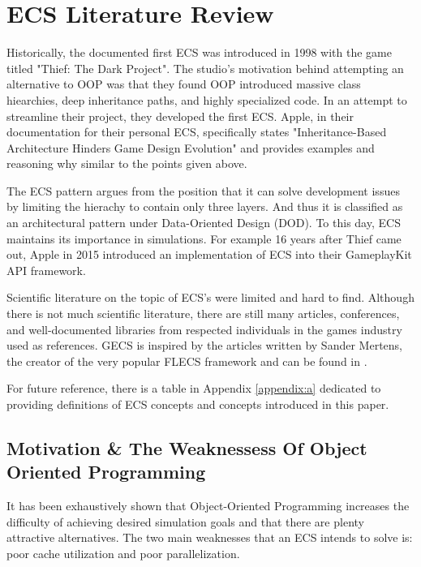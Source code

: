 \section{ECS Literature Review}
\label{chap:1}

Historically, the documented first ECS was introduced in 1998 with the game titled "Thief: The Dark Project".\cite{RomeoPHD} The studio's motivation behind attempting an alternative to OOP was that they found OOP introduced massive class hiearchies, deep inheritance paths, and highly specialized code. In an attempt to streamline their project, they developed the first ECS.\cite{Haerkoenen2019} Apple, in their documentation for their personal ECS, specifically states "Inheritance-Based Architecture Hinders Game Design Evolution" and provides examples and reasoning why similar to the points given above.\cite{AppleECSBad}

The ECS pattern argues from the position that it can solve development issues by limiting the hierachy to contain only three layers. And thus it is classified as an architectural pattern under Data-Oriented Design (DOD).\cite{RomeoPHD} To this day, ECS maintains its importance in simulations. For example 16 years after Thief came out, Apple in 2015 introduced an implementation of ECS into their GameplayKit API framework. \cite{AppleECS}

Scientific literature on the topic of ECS's were limited and hard to find. Although there is not much scientific literature, there are still many articles, conferences, and well-documented libraries from respected individuals in the games industry used as references. GECS is inspired by the articles written by Sander Mertens, the creator of the very popular FLECS framework and can be found in \cite{SanderMertensECS}. 

For future reference, there is a table in Appendix \ref{appendix:a} dedicated to providing definitions of ECS concepts and concepts introduced in this paper.

\subsection{Motivation \& The Weaknessess Of Object Oriented Programming}

It has been exhaustively shown that Object-Oriented Programming increases the difficulty of achieving desired simulation goals and that there are plenty attractive alternatives. The two main weaknesses that an ECS intends to solve is: poor cache utilization and poor parallelization.\cite{RomeoPHD}

